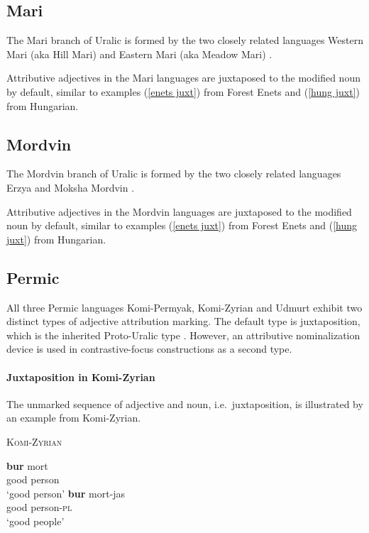 \subsection{Mari}
The Mari branch of Uralic is formed by the two closely related languages Western Mari (aka Hill Mari) and Eastern Mari (aka Meadow Mari) \citep[231]{salminen2007}.

Attributive adjectives in the Mari languages are juxtaposed to the modified noun by default, similar to examples (\ref{enets juxt}) from Forest Enets and (\ref{hung juxt}) from Hungarian.

\subsection{Mordvin}
The Mordvin branch of Uralic is formed by the two closely related languages Erzya and Moksha Mordvin \citep[231]{salminen2007}.

Attributive adjectives in the Mordvin languages are juxtaposed to the modified noun by default, similar to examples (\ref{enets juxt}) from Forest Enets and (\ref{hung juxt}) from Hungarian.

\subsection{Permic}
All three Permic languages Komi-Permyak, Komi-Zyrian and Udmurt exhibit two distinct types of adjective attribution marking. The default type is juxtaposition, which is the inherited Proto-Uralic type \citep[80–81]{decsy1990}. However, an attributive nominalization device is used in contrastive-focus constructions as a second type.

\paragraph{Juxtaposition in Komi-Zyrian}
The unmarked sequence of adjective and noun, i.e.~juxtaposition, is illustrated by an example from Komi-Zyrian.
\begin{exe}
\ex \textsc{Komi-Zyrian} \citep[287]{lytkin1966a}
\begin{xlist} 
\ex
\gll 		\textbf{bur} 	mort\\
		good	person\\
\glt		‘good person’
\ex
\gll		\textbf{bur}	mort-jas\\
		good	person-\textsc{pl}\\
\glt		‘good people’
\end{xlist}
\end{exe}

